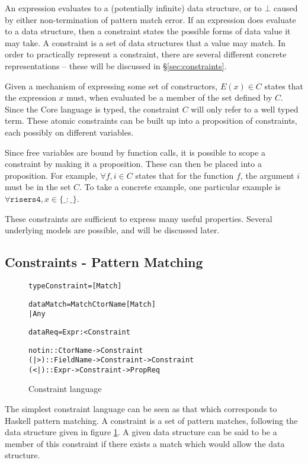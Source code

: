 \documentclass[preprint]{sigplanconf}
\newcommand{\T}[1]{\texttt{#1}}
\newenvironment{code}{\begin{alltt}\small}{\end{alltt}}
\newcommand{\g}[1]{\{#1\}} %
\begin{document}
An expression evaluates to a (potentially infinite) data structure, or to $\bot{}$ caused by either non-termination of pattern match error. If an expression does evaluate to a data structure, then a constraint states the possible forms of data value it may take. A constraint is a set of data structures that a value may match. In order to practically represent a constraint, there are several different concrete representations -- these will be discussed in \S\ref{sec:constraints}.

Given a mechanism of expressing some set of constructors, $E(x) \in C$ states that the expression $x$ must, when evaluated be a member of the set defined by $C$. Since the Core language is typed, the constraint $C$ will only refer to a well typed term. These atomic constraints can be built up into a proposition of constraints, each possibly on different variables.

Since free variables are bound by function calls, it is possible to scope a constraint by making it a proposition. These can then be placed into a proposition. For example, $\forall f, i \in C$ states that for the function $f$, the argument $i$ must be in the set $C$. To take a concrete example, one particular example is $\forall \T{risers4}, x \in \g{\_ : \_}$.

These constraints are sufficient to express many useful properties. Several underlying models are possible, and will be discussed later.

\subsection{Constraints - Pattern Matching}

\begin{figure}
\begin{code}
type Constraint = [Match]

data Match = Match CtorName [Match]
           | Any

data Req = Expr :< Constraint

notin :: CtorName -> Constraint
(|>) :: FieldName -> Constraint -> Constraint
(<|) :: Expr -> Constraint -> Prop Req
\end{code}
\caption{Constraint language}
\label{fig:constraint}
\end{figure}

The simplest constraint language can be seen as that which corresponds to Haskell pattern matching. A constraint is a set of pattern matches, following the data structure given in figure \ref{fig:constraint}. A given data structure can be said to be a member of this constraint if there exists a match which would allow the data structure.
\end{document}
